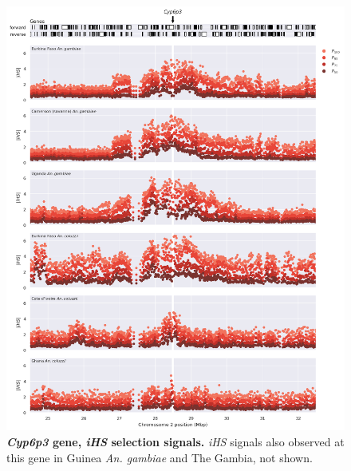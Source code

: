 \documentclass[a4paper,11pt,abstracton,hidelinks]{scrartcl}
\begin{document}
\begin{figure}[t!]
	\begin{center}
		\includegraphics*[width=1.1\linewidth,center]{artwork/locus_cyp6p3_ihs.png}
	\end{center}
	\caption[\textit{Cyp6p3} gene, \textit{iHS} selection signals]{
	\textbf{\textit{Cyp6p3} gene, \textit{iHS} selection signals.}
	\textit{iHS} signals also observed at this gene in Guinea \textit{An. gambiae} and The Gambia, not shown. 
	} 
	\label{fig:locus_cyp6p3_ihs}
\end{figure}


\clearpage
\end{document}

